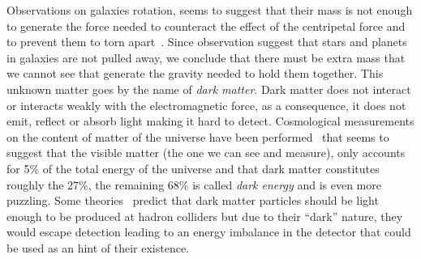 Observations on galaxies rotation, seems to suggest that their mass is not
enough to generate the force needed to counteract the effect of the centripetal
force and to prevent them to torn apart~\cite{RotationCurves}. Since observation
suggest that stars and planets in galaxies are not pulled away, we conclude that
there must be extra mass that we cannot see that generate the gravity needed to
hold them together. This unknown matter goes by the name of \emph{dark
  matter}. Dark matter does not interact or interacts weakly with the
electromagnetic force, as a consequence, it does not emit, reflect or absorb
light making it hard to detect. Cosmological measurements on the content of
matter of the universe have been performed~\cite{DMEvidence} that seems to
suggest that the visible matter (the one we can see and measure), only accounts
for 5\% of the total energy of the universe and that dark matter constitutes
roughly the 27\%, the remaining 68\% is called \emph{dark energy} and is even
more puzzling. Some theories~\cite{WIMPIntro} predict that dark matter particles
should be light enough to be produced at hadron colliders but due to their
``dark'' nature, they would escape detection leading to an energy imbalance in
the detector that could be used as an hint of their existence.
